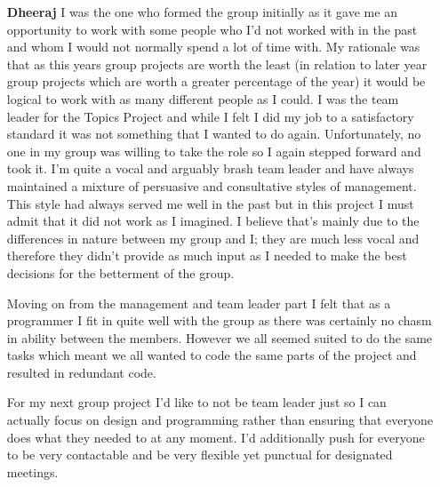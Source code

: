 \documentclass[a4paper,12pt]{article}
\begin{document}
\begin{itemize}
\item[\textbf{Dheeraj}]
I was the one who formed the group initially as it gave me an opportunity to work with some people who I'd not worked with in the past and whom I would not normally spend a lot of time with. My rationale was that as this years group projects are worth the least (in relation to later year group projects which are worth a greater percentage of the year) it would be logical to work with as many different people as I could. I was the team leader for the Topics Project and while I felt I did my job to a satisfactory standard it was not something that I wanted to do again. Unfortunately, no one in my group was willing to take the role so I again stepped forward and took it. I'm quite a vocal and arguably brash team leader and have always maintained a mixture of persuasive and consultative styles of management. This style had always served me well in the past but in this project I must admit that it did not work as I imagined. I believe that's mainly due to the differences in nature between my group and I; they are much less vocal and therefore they didn't provide as much input as I needed to make the best decisions for the betterment of the group. 

Moving on from the management and team leader part I felt that as a programmer I fit in quite well with the group as there was certainly no chasm in ability between the members. However we all seemed suited to do the same tasks which meant we all wanted to code the same parts of the project and resulted in redundant code.

For my next group project I'd like to not be team leader just so I can actually focus on design and programming rather than ensuring that everyone does what they needed to at any moment. I'd additionally push for everyone to be very contactable and be very flexible yet punctual for designated meetings.  

\end{itemize}
\end{document}

